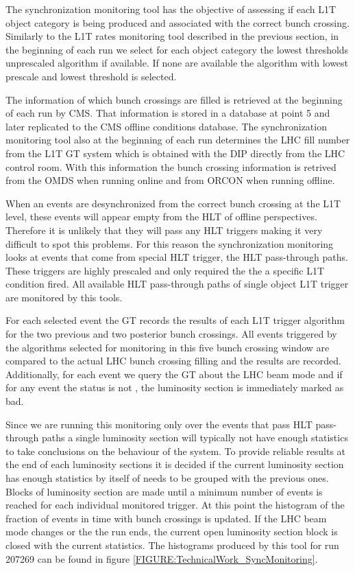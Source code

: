 
The synchronization monitoring tool has the objective of assessing if each \gls{L1T} object category is being produced and associated with the correct bunch crossing. Similarly to the \gls{L1T} rates monitoring tool described in the previous section, in the beginning of each run we select for each object category the lowest thresholds unprescaled algorithm if available. If none are available the algorithm with lowest prescale and lowest threshold is selected.

The information of which bunch crossings are filled is retrieved at the beginning of each run by \gls{CMS}. That information is stored in a database at point 5 and later replicated to the \gls{CMS} offline conditions database. The synchronization monitoring tool also at the beginning of each run determines the \gls{LHC} fill number from the \gls{L1T} \gls{GT} system which is obtained with the \gls{DIP} directly from the \gls{LHC} control room. With this information the bunch crossing information is retrived from the \gls{OMDS} when running online and from \gls{ORCON} when running offline.

When an events are desynchronized from the correct bunch crossing at the \gls{L1T} level, these events will appear empty from the \gls{HLT} of offline perspectives. Therefore it is unlikely that they will pass any \gls{HLT} triggers making it very difficult to spot this problems. For this reason the synchronization monitoring looks at events that come from special \gls{HLT} trigger, the \gls{HLT} pass-through paths. These triggers are highly prescaled and only required the the a specific \gls{L1T} condition fired. All available \gls{HLT} pass-through paths of single object \gls{L1T} trigger are monitored by this tools.

For each selected event the \gls{GT} records the results of each \gls{L1T} trigger algorithm for the two previous and two posterior bunch crossings. All events triggered by the algorithms selected for monitoring in this five bunch crossing window are compared to the actual \gls{LHC} bunch crossing filling and the results are recorded. Additionally, for each event we query the \gls{GT} about the \gls{LHC} beam mode and if for any event the status is not , the luminosity section is immediately marked as bad.

Since we are running this monitoring only over the events that pass \gls{HLT} pass-through paths a single luminosity section will typically not have enough statistics to take conclusions on the behaviour of the system. To provide reliable results at the end of each luminosity sections it is decided if the current luminosity section has enough statistics by itself of needs to be grouped with the previous ones. Blocks of luminosity section are made until a minimum number of events is reached for each individual monitored trigger. At this point the histogram of the fraction of events in time with bunch crossings is updated. If the \gls{LHC} beam mode changes or the the run ends, the current open luminosity section block is closed with the current statistics. The histograms produced by this tool for run 207269 can be found in figure \ref{FIGURE:TechnicalWork_SyncMonitoring}.

